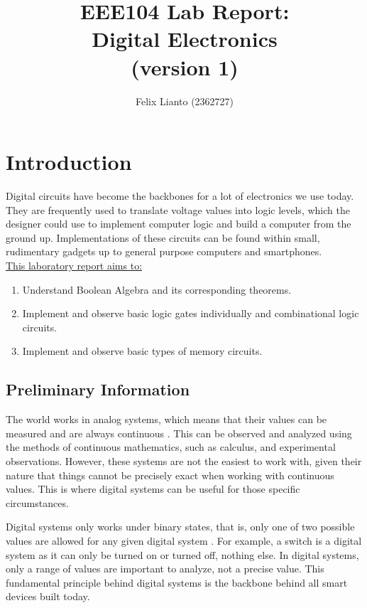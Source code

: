 \documentclass{report}
\begin{document}
\title{\textbf{EEE104 Lab Report:}\\ Digital Electronics\\ \small (version 1)}
\author{Felix Lianto (2362727)}
\maketitle

\section{Introduction}
	Digital circuits have become the backbones for a lot of electronics we use today. They are frequently used to translate voltage values into logic levels, which the designer could use to implement computer logic and build a computer from the ground up. Implementations of these circuits can be found within small, rudimentary gadgets up to general purpose computers and smartphones. \\

	\underline{This laboratory report aims to:}
	\begin{enumerate}
		\item Understand Boolean Algebra and its corresponding theorems.
		\item Implement and observe basic logic gates individually and combinational logic circuits.
		\item Implement and observe basic types of memory circuits.
	\end{enumerate} 
	
	\subsection{Preliminary Information}
	The world works in analog systems, which means that their values can be measured and are always continuous \autocite{widmerDigitalSystemsPrinciples2018}. This can be observed and analyzed using the methods of continuous mathematics, such as calculus, and experimental observations. However, these systems are not the easiest to work with, given their nature that things cannot be precisely exact when working with continuous values. This is where digital systems can be useful for those specific circumstances.
	
	Digital systems only works under binary states, that is, only one of two possible values are allowed for any given digital system \autocite{widmerDigitalSystemsPrinciples2018}. For example, a switch is a digital system as it can only be turned on or turned off, nothing else. In digital systems, only a range of values are important to analyze, not a precise value. This fundamental principle behind digital systems is the backbone behind all smart devices built today.
	
\end{document}
